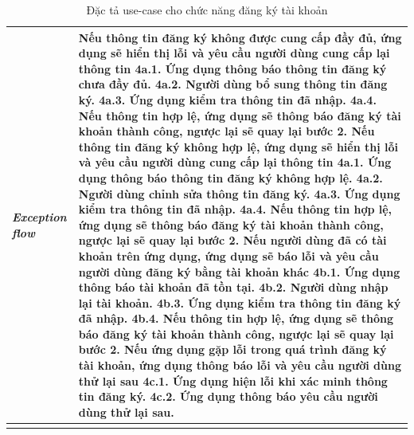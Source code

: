 \begin{center}
\begin{longtable}{
        |>{\raggedright\arraybackslash}p{3cm}
        |>{\raggedright\arraybackslash}p{13cm}
        |}
        \\\hdashline
        \rowcolor{cyan!10!white} \textit{Exception flow} & 
        \textbf{Nếu thông tin đăng ký không được cung cấp đầy đủ, ứng dụng sẽ hiển thị lỗi và yêu cầu người dùng cung cấp lại thông tin} \newline
        4a.1. Ứng dụng thông báo thông tin đăng ký chưa đầy đủ. \newline
        4a.2. Người dùng bổ sung thông tin đăng ký. \newline
        4a.3. Ứng dụng kiểm tra thông tin đã nhập. \newline
        4a.4. Nếu thông tin hợp lệ, ứng dụng sẽ thông báo đăng ký tài khoản thành công, ngược lại sẽ quay lại bước 2. \newline
        \textbf{Nếu thông tin đăng ký không hợp lệ, ứng dụng sẽ hiển thị lỗi và yêu cầu người dùng cung cấp lại thông tin} \newline
        4a.1. Ứng dụng thông báo thông tin đăng ký không hợp lệ. \newline
        4a.2. Người dùng chỉnh sửa thông tin đăng ký. \newline
        4a.3. Ứng dụng kiểm tra thông tin đã nhập. \newline
        4a.4. Nếu thông tin hợp lệ, ứng dụng sẽ thông báo đăng ký tài khoản thành công, ngược lại sẽ quay lại bước 2. \newline
        \textbf{Nếu người dùng đã có tài khoản trên ứng dụng, ứng dụng sẽ báo lỗi và yêu cầu người dùng đăng ký bằng tài khoản khác} \newline
        4b.1. Ứng dụng thông báo tài khoản đã tồn tại. \newline
        4b.2. Người dùng nhập lại tài khoản. \newline
        4b.3. Ứng dụng kiểm tra thông tin đăng ký đã nhập. \newline
        4b.4. Nếu thông tin hợp lệ, ứng dụng sẽ thông báo đăng ký tài khoản thành công, ngược lại sẽ quay lại bước 2. \newline
        \textbf{Nếu ứng dụng gặp lỗi trong quá trình đăng ký tài khoản, ứng dụng thông báo lỗi và yêu cầu người dùng thử lại sau} \newline
        4c.1. Ứng dụng hiện lỗi khi xác minh thông tin đăng ký. \newline
        4c.2. Ứng dụng thông báo yêu cầu người dùng thử lại sau. 
        \\\hline
        \caption{Đặc tả use-case cho chức năng đăng ký tài khoản}
    \end{longtable}
\end{center}
